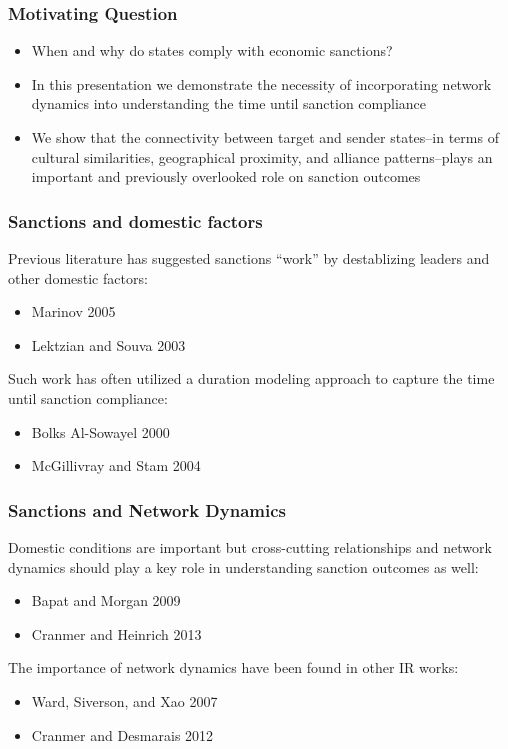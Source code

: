 \begin{frame}
\titlepage
\end{frame}

\begin{frame}
\frametitle{Motivating Question}

\begin{itemize}
	\item When and why do states comply with economic sanctions? 
	\item In this presentation we demonstrate the necessity of incorporating network dynamics into understanding the time until sanction compliance
	\item We show that the connectivity between target and sender states--in terms of cultural similarities, geographical proximity, and alliance patterns--plays an important and previously overlooked role on sanction outcomes
\end{itemize}

\end{frame}

\begin{frame}
\frametitle{Sanctions and domestic factors}
Previous literature has suggested sanctions ``work'' by destablizing leaders and other domestic factors:
\begin{itemize}
	\item Marinov 2005
	\item Lektzian and Souva 2003
\end{itemize}

Such work has often utilized a duration modeling approach to capture the time until sanction compliance: 
\begin{itemize}
	\item Bolks Al-Sowayel 2000
	\item McGillivray and Stam 2004
\end{itemize}


\end{frame}

\begin{frame}
\frametitle{Sanctions and Network Dynamics}
Domestic conditions are important but cross-cutting relationships and network dynamics should play a key role in understanding sanction outcomes as well:
\begin{itemize}
	\item Bapat and Morgan 2009
	\item Cranmer and Heinrich 2013
\end{itemize}

The importance of network dynamics have been found in other IR works:
\begin{itemize}
	\item Ward, Siverson, and Xao 2007
	\item Cranmer and Desmarais 2012
\end{itemize} 
\end{frame}

